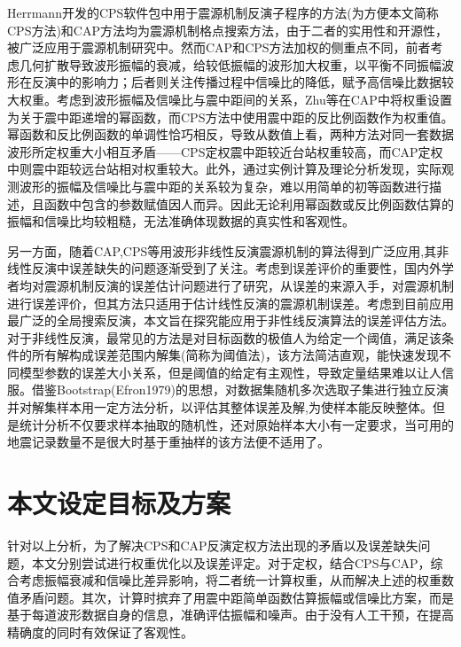 Herrmann开发的CPS软件包中用于震源机制反演子程序的方法\citep{Herrmann1989}(为方便本文简称CPS方法)和CAP方法\citep{Zhao1994,Zhu1996,Tan2006}均为震源机制格点搜索方法，由于二者的实用性和开源性，被广泛应用于震源机制研究中。然而CAP和CPS方法加权的侧重点不同，前者考虑几何扩散导致波形振幅的衰减，给较低振幅的波形加大权重，以平衡不同振幅波形在反演中的影响力；后者则关注传播过程中信噪比的降低，赋予高信噪比数据较大权重。考虑到波形振幅及信噪比与震中距间的关系，Zhu等\citep{Zhu1996}在CAP中将权重设置为关于震中距递增的幂函数，而CPS方法中使用震中距的反比例函数作为权重值。幂函数和反比例函数的单调性恰巧相反，导致从数值上看，两种方法对同一套数据波形所定权重大小相互矛盾——CPS定权震中距较近台站权重较高，而CAP定权中则震中距较远台站相对权重较大。此外，通过实例计算及理论分析发现，实际观测波形的振幅及信噪比与震中距的关系较为复杂，难以用简单的初等函数进行描述，且函数中包含的参数赋值因人而异。因此无论利用幂函数或反比例函数估算的振幅和信噪比均较粗糙，无法准确体现数据的真实性和客观性。

另一方面，随着CAP,CPS等用波形非线性反演震源机制的算法得到广泛应用\citep{Luo2015,DAmico2014},其非线性反演中误差缺失的问题逐渐受到了关注。考虑到误差评价的重要性，国内外学者均对震源机制反演的误差估计问题进行了研究，\citet{Duputel2012}从误差的来源入手，对震源机制进行误差评价，但其方法只适用于估计线性反演的震源机制误差。考虑到目前应用最广泛的全局搜索反演，本文旨在探究能应用于非性线反演算法的误差评估方法。对于非线性反演，最常见的方法是对目标函数的极值人为给定一个阈值，满足该条件的所有解构成误差范围内解集(简称为阈值法)，该方法简洁直观，能快速发现不同模型参数的误差大小关系，但是阈值的给定有主观性，导致定量结果难以让人信服。借鉴Bootstrap(Efron1979)的思想，对数据集随机多次选取子集进行独立反演并对解集样本用一定方法分析，以评估其整体误差及解,为使样本能反映整体。但是统计分析不仅要求样本抽取的随机性，还对原始样本大小有一定要求，当可用的地震记录数量不是很大时基于重抽样的该方法便不适用了。

\section{本文设定目标及方案}

针对以上分析，为了解决CPS和CAP反演定权方法出现的矛盾以及误差缺失问题，本文分别尝试进行权重优化以及误差评定。对于定权，结合CPS与CAP，综合考虑振幅衰减和信噪比差异影响，将二者统一计算权重，从而解决上述的权重数值矛盾问题。其次，计算时摈弃了用震中距简单函数估算振幅或信噪比方案，而是基于每道波形数据自身的信息，准确评估振幅和噪声。由于没有人工干预，在提高精确度的同时有效保证了客观性。

